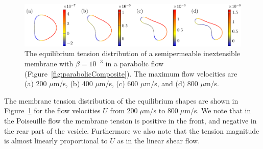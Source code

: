\documentclass[prb,preprint,showpacs,preprintnumbers,amsmath,amssymb,longbibliography]{revtex4-1}
\newif\ifTikz
\begin{document}
\begin{figure}[htp]
  \centering
  \ifTikz
  
  \else
  \includegraphics{figures/parabolicTensions.pdf}
  \fi
  \caption{\label{fig:parabolicTensions} The equilibrium tension
  distribution of a semipermeable inextensible membrane with
  $\beta=10^{-3}$ in a parabolic flow
  (Figure~\ref{fig:parabolicComposite}). The maximum flow velocities are
  (a) 200 $\mu$m/s, (b) 400 $\mu$m/s, (c) 600 $\mu$m/s, and (d) 800
  $\mu$m/s.}
\end{figure}
The membrane tension distribution of the equilibrium shapes are shown in
Figure~\ref{fig:parabolicTensions} for the flow velocities $U$ from
$200\;\mu$m/s to $800 \;\mu$m/s. We note that in the Poiseuille flow the
membrane tension is positive in the front, and negative in the rear part
of the vesicle. Furthermore we also note that the tension magnitude is
almost linearly proportional to $U$ as in the linear shear flow.

\end{document}
